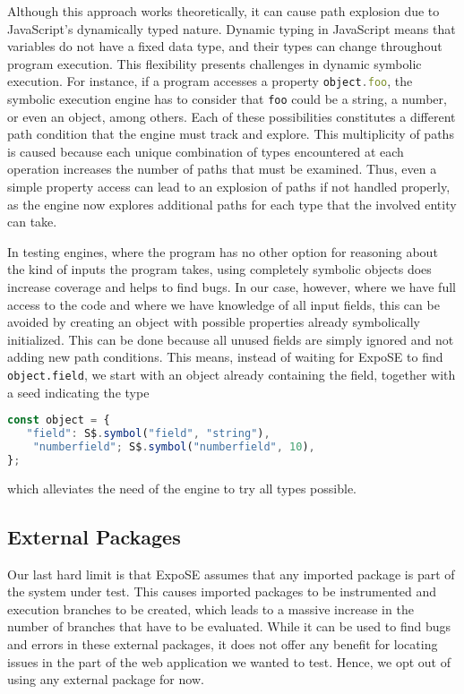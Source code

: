 Although this approach works theoretically, it can cause path explosion due to JavaScript’s dynamically typed nature.
Dynamic typing in JavaScript means that variables do not have a fixed data type, and their types can change throughout program execution. This flexibility presents challenges in dynamic symbolic execution.
For instance, if a program accesses a property \lstinline[language=JavaScript]{object.foo}, the symbolic execution engine has to consider that 
\lstinline[language=JavaScript]{foo} could be a string, a number, or even an object, among others. Each of these possibilities constitutes a different path condition that the engine must track and explore. This multiplicity of paths is caused because each unique combination of types encountered at each operation increases the number of paths that must be examined. Thus, even a simple property access can lead to an explosion of paths if not handled properly, as the engine now explores additional paths for each type that the involved entity can take.

In testing engines, where the program has no other option for reasoning about the kind of inputs the program takes, using completely symbolic objects does increase coverage and helps to find bugs.
In our case, however, where we have full access to the code and where we have knowledge of all input fields, this can be avoided by creating an object with possible properties already symbolically initialized. This can be done because all unused fields are simply ignored and not adding new path conditions. 
This means, instead of waiting for ExpoSE to find \lstinline{object.field}, we start with an object already containing the field, together with a seed indicating the type  
\begin{lstlisting}[language=JavaScript]
const object = {
   "field": S$.symbol("field", "string"),
    "numberfield"; S$.symbol("numberfield", 10),
};
\end{lstlisting}

which alleviates the need of the engine to try all types possible.




\subsection{External Packages}
\label{sec:externalpack}
Our last hard limit is that ExpoSE assumes that any imported package is part of the system under test. This causes imported packages to be instrumented and execution branches to be created, which leads to a massive increase in the number of branches that have to be evaluated. While it can be used to find bugs and errors in these external packages, it does not offer any benefit for locating issues in the part of the web application we wanted to test. 
Hence, we opt out of using any external package for now.



